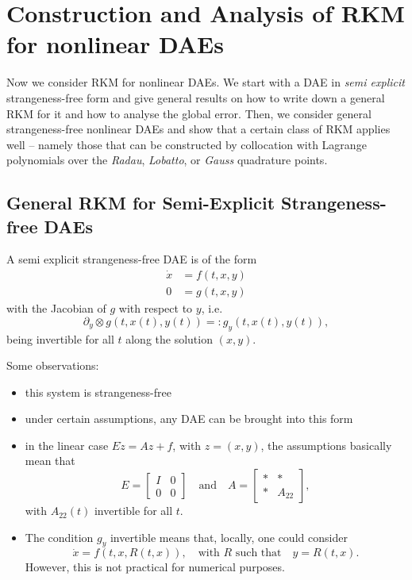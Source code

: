 \documentclass[]{book}
\providecommand{\tightlist}{%
  \setlength{\itemsep}{0pt}\setlength{\parskip}{0pt}}
\theoremstyle{definition}
\theoremstyle{definition}
\theoremstyle{definition}
\theoremstyle{remark}
\begin{document}
\hypertarget{construction-and-analysis-of-rkm-for-nonlinear-daes}{%
\chapter{Construction and Analysis of RKM for nonlinear DAEs}\label{construction-and-analysis-of-rkm-for-nonlinear-daes}}

Now we consider RKM for nonlinear DAEs. We start with a DAE in \emph{semi explicit} strangeness-free form and give general results on how to write down a general RKM for it and how to analyse the global error. Then, we consider general strangeness-free nonlinear DAEs and show that a certain class of RKM applies well -- namely those that can be constructed by collocation with Lagrange polynomials over the \emph{Radau}, \emph{Lobatto}, or \emph{Gauss} quadrature points.

\hypertarget{general-rkm-for-semi-explicit-strangeness-free-daes}{%
\section{General RKM for Semi-Explicit Strangeness-free DAEs}\label{general-rkm-for-semi-explicit-strangeness-free-daes}}

A semi explicit strangeness-free DAE is of the form
\begin{align}
\dot x &= f(t, x, y) \label{eq:semexp-dae-diff} \\
0 &= g(t, x, y) \label{eq:semexp-dae-alg}
\end{align}
with the Jacobian of \(g\) with respect to \(y\), i.e.
\[
\partial_y\otimes g(t, x(t), y(t)) =: g_y(t, x(t), y(t)),
\]
being invertible for all \(t\) along the solution \((x,y)\).

Some observations:

\begin{itemize}
\tightlist
\item
  this system is strangeness-free
\item
  under certain assumptions, any DAE can be brought into this form
\item
  in the linear case \(E\dot z = Az +f\), with \(z=(x,y)\), the assumptions basically mean that
  \[
   E = \begin{bmatrix} I & 0 \\ 0 & 0 \end{bmatrix} \quad\text{and}\quad 
   A = \begin{bmatrix} * & * \\ * & A_{22} \end{bmatrix},
  \]
  with \(A_{22}(t)\) invertible for all \(t\).
\item
  The condition \(g_y\) invertible means that, locally, one could consider
  \[
   \dot x = f(t, x, R(t,x)), \quad\text{with $R$ such that}\quad y=R(t,x).
  \]
  However, this is not practical for numerical purposes.
\end{itemize}
\end{document}
